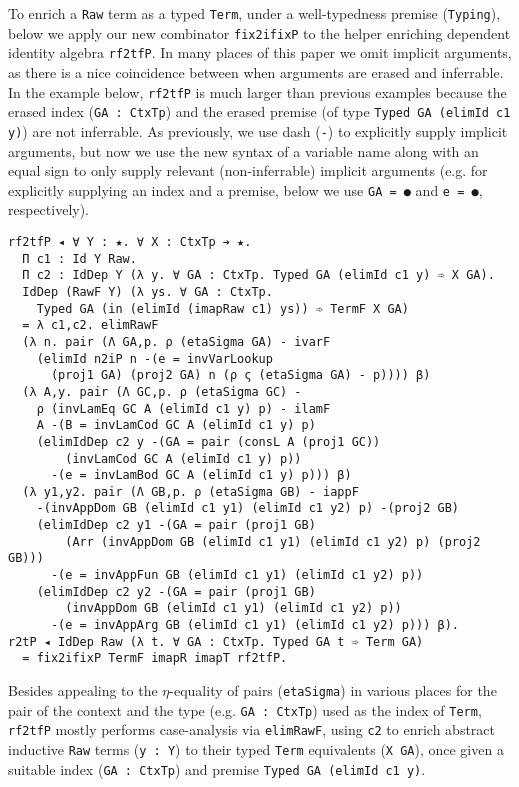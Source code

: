 \documentclass[acmsmall,screen]{acmart}
\begin{document}
To enrich a \verb;Raw; term as a typed \verb;Term;, under a
well-typedness premise (\verb;Typing;), below we apply our new
combinator \verb;fix2ifixP; to the helper enriching dependent identity
algebra \verb;rf2tfP;. In many places of this paper we omit implicit
arguments, as there is a nice coincidence between when arguments are
erased and inferrable. In the example below, \verb;rf2tfP; is much
larger than previous examples because the erased index
(\verb;GA : CtxTp;) and the erased premise (of type
\verb;Typed GA (elimId c1 y);) are not inferrable. As previously, we
use dash (\verb;-;) to explicitly supply implicit arguments, but now
we use the new syntax of a variable name along with an equal sign to
only supply relevant (non-inferrable) implicit arguments
(e.g. for explicitly supplying an index and a premise,
below we use \verb;GA = ●; and \verb;e = ●;, respectively). 
\begin{verbatim}
rf2tfP ◂ ∀ Y : ★. ∀ X : CtxTp ➔ ★.
  Π c1 : Id Y Raw.
  Π c2 : IdDep Y (λ y. ∀ GA : CtxTp. Typed GA (elimId c1 y) ➾ X GA).
  IdDep (RawF Y) (λ ys. ∀ GA : CtxTp.
    Typed GA (in (elimId (imapRaw c1) ys)) ➾ TermF X GA)
  = λ c1,c2. elimRawF
  (λ n. pair (Λ GA,p. ρ (etaSigma GA) - ivarF
    (elimId n2iP n -(e = invVarLookup
      (proj1 GA) (proj2 GA) n (ρ ς (etaSigma GA) - p)))) β)
  (λ A,y. pair (Λ GC,p. ρ (etaSigma GC) - 
    ρ (invLamEq GC A (elimId c1 y) p) - ilamF
    A -(B = invLamCod GC A (elimId c1 y) p)
    (elimIdDep c2 y -(GA = pair (consL A (proj1 GC))
        (invLamCod GC A (elimId c1 y) p))
      -(e = invLamBod GC A (elimId c1 y) p))) β)
  (λ y1,y2. pair (Λ GB,p. ρ (etaSigma GB) - iappF 
    -(invAppDom GB (elimId c1 y1) (elimId c1 y2) p) -(proj2 GB)
    (elimIdDep c2 y1 -(GA = pair (proj1 GB)
        (Arr (invAppDom GB (elimId c1 y1) (elimId c1 y2) p) (proj2 GB)))
      -(e = invAppFun GB (elimId c1 y1) (elimId c1 y2) p))
    (elimIdDep c2 y2 -(GA = pair (proj1 GB)
        (invAppDom GB (elimId c1 y1) (elimId c1 y2) p))
      -(e = invAppArg GB (elimId c1 y1) (elimId c1 y2) p))) β).
r2tP ◂ IdDep Raw (λ t. ∀ GA : CtxTp. Typed GA t ➾ Term GA)
  = fix2ifixP TermF imapR imapT rf2tfP.
\end{verbatim}
Besides appealing to the $\eta$-equality of pairs (\verb;etaSigma;)
in various places for the pair of the context and the type
(e.g. \verb;GA : CtxTp;) used as the index of \verb;Term;,
\verb;rf2tfP; mostly performs case-analysis via \verb;elimRawF;, using
\verb;c2; to enrich abstract inductive \verb;Raw; terms (\verb;y : Y;)
to their typed \verb;Term; equivalents
(\verb;X GA;), once given a suitable index (\verb;GA : CtxTp;) and premise
\verb;Typed GA (elimId c1 y);.
\end{document}
